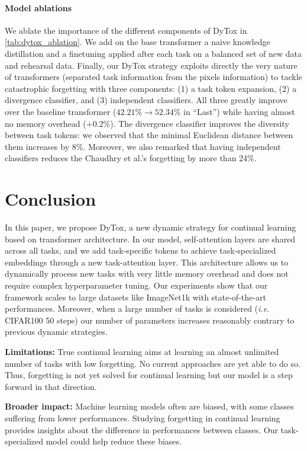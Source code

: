 \paragraph{Model ablations} We ablate the importance of the different components of DyTox in
\autoref{tab:dytox_ablation}. We add on the base transformer a naive knowledge distillation
\cite{hinton2015knowledge_distillation} and a finetuning
\cite{castro2018end_to_end_inc_learn,hou2019ucir,douillard2020podnet,yan2021der} applied after each
task on a balanced set of new data and rehearsal data. Finally, our DyTox strategy exploits directly
the very nature of transformers (separated task information from the pixels information) to tackle
catastrophic forgetting with three components: (1) a task token expansion, (2) a divergence
classifier, and (3) independent classifiers. All three greatly improve over the baseline transformer
($42.21\% \rightarrow 52.34\%$ in ``Last'') while having almost no memory overhead ($+0.2\%$). The
divergence classifier improves the diversity between task tokens: we observed that the minimal
Euclidean distance between them increases by 8\%. Moreover, we also remarked that having independent
classifiers reduces the Chaudhry et al.'s forgetting \cite{chaudhry2018riemannien_walk} by more than
24\%.




\section{Conclusion}

In this paper, we propose DyTox, a new dynamic strategy for continual learning based on transformer
architecture. In our model, self-attention layers are shared across all tasks, and we add
task-specific tokens to achieve task-specialized embeddings through a new task-attention layer.
This architecture allows us to dynamically process new tasks with very little memory overhead and
does not require complex hyperparameter tuning. Our experiments show that our framework scales to
large datasets like ImageNet1k with state-of-the-art performances. Moreover, when a large number of
tasks is considered (\textit{i.e.} CIFAR100 50 steps) our number of parameters increases reasonably
contrary to previous dynamic strategies.

\vspace{0.1cm}\noindent \textbf{Limitations:} True continual learning aims at learning an almost
unlimited number of tasks with low forgetting. No current approaches are yet able to do so. Thus,
forgetting is not yet solved for continual learning but our model is a step forward in that
direction.

\noindent \textbf{Broader impact:} Machine learning models often are biased, with some classes
suffering from lower performances. Studying forgetting in continual learning provides insights about
the difference in performances between classes. Our task-specialized model could help reduce these
biases.
